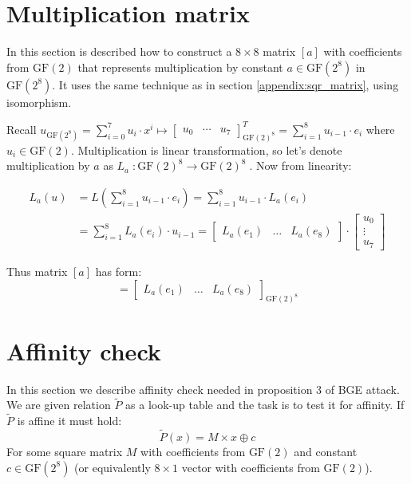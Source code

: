 \documentclass[11pt,oneside,final]{fithesis2}
\newcommand{\gfe}{\ensuremath{\text{GF}\left(2^8\right)}}
\newcommand{\gf}{\ensuremath{\text{GF}\left(2\right)}}
\begin{document}
    \section{Multiplication matrix}\label{appendix:mult_matrix}
    In this section is described how to construct a $8 \times 8$ matrix $[a]$ with coefficients from $\gf$ that represents multiplication by 
    constant $a \in \gfe$ in $\gfe$. It uses the same technique as in section \ref{appendix:sqr_matrix}, using isomorphism.
    
    Recall $u_{\gfe} = \sum_{i=0}^{7} u_i \cdot x^i \mapsto \begin{bmatrix} u_0 & \cdots & u_7\end{bmatrix}^T_{\gf^8} = \sum_{i=1}^8 u_{i-1} \cdot e_i$
    where $u_i \in \gf$. Multiplication is linear transformation, so let's denote multiplication by $a$ as $L_a \; : \gf^8 \rightarrow \gf^8\; $.
    Now from linearity: 
    
    \begin{align*}
	L_a(u) &= L\left(\sum_{i=1}^8 u_{i-1} \cdot e_i\right) = \sum_{i=1}^8 u_{i-1} \cdot L_a(e_i) \\
	       &= \sum_{i=1}^8 L_a(e_i) \cdot u_{i-1} 
	        = \begin{bmatrix} L_a\left(e_1\right) & \dots & L_a\left(e_8\right) \end{bmatrix} \cdot 
		  \begin{bmatrix} 
		    u_0\\
		    \vdots\\
		    u_7
		  \end{bmatrix} 
    \end{align*}
    
    Thus matrix $[a]$ has form:
    \begin{equation*}
     [a] = \begin{bmatrix} L_a\left(e_1\right) & \dots & L_a\left(e_8\right) \end{bmatrix}_{\gf^8}
    \end{equation*}


    \section{Affinity check}\label{appendix:affcheck}
    In this section we describe affinity check needed in proposition 3 of BGE attack. We are given relation $\widetilde{P}$ as a look-up table
    and the task is to test it for affinity. If $\widetilde{P}$ is affine it must hold:
    \begin{equation}
	\widetilde{P}\left(x\right) = M \times x \oplus c
    \end{equation}
    For some square matrix $M$ with coefficients from $\text{GF}(2)$ and constant $c \in \gfe$ (or equivalently $8\times1$ vector with coefficients from $\text{GF}(2)$).\\
    
\end{document}
